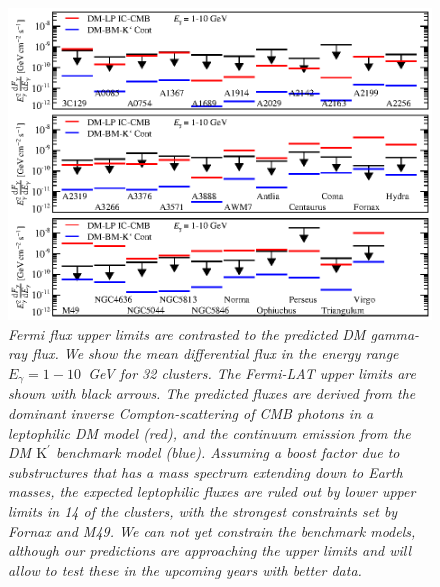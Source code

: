\documentclass[10pt,aps,pra,reprint,amsmath,amsfonts,amssymb,showpacs]{revtex4-1}
\newcommand{\rmn}{\mathrm}
\newcommand{\Kp}{\rmn{K}^\prime}
\begin{document}
\begin{figure}
\begin{minipage}{2.0\columnwidth}
  \includegraphics[width=0.99\columnwidth]{figures/Fermi.comp.DM.eps}
  \caption{\it Fermi flux upper limits are contrasted to the predicted DM
    gamma-ray flux. We show the mean differential flux in the energy range
    $E_\gamma=1-10$~GeV for 32 clusters. The Fermi-LAT upper limits are shown
    with black arrows. The predicted fluxes are derived from the dominant
    inverse Compton-scattering of CMB photons in a leptophilic DM model (red),
    and the continuum emission from the DM $\Kp$ benchmark model
    (blue). Assuming a boost factor due to substructures that has a mass
    spectrum extending down to Earth masses, the expected leptophilic fluxes are
    ruled out by lower upper limits in 14 of the clusters, with the strongest
    constraints set by Fornax and M49. We can not yet constrain the benchmark
    models, although our predictions are approaching the upper limits and will
    allow to test these in the upcoming years with better data.}
 \label{fig14}
\end{minipage}
\end{figure}
\end{document}
